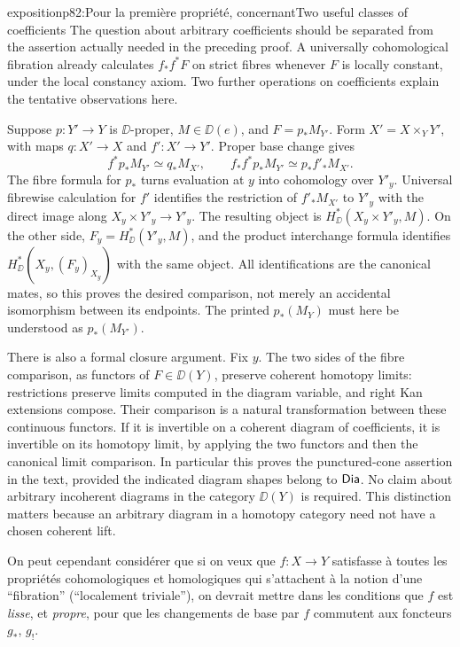 \begin{dcomment}{exposition}{p82:Pour la première propriété, concernant}{Two useful classes of coefficients}
The question about arbitrary coefficients should be separated from the assertion actually needed in the preceding proof. A universally cohomological fibration already calculates $f_*f^*F$ on strict fibres whenever $F$ is locally constant, under the local constancy axiom. Two further operations on coefficients explain the tentative observations here.

Suppose $p:Y'\to Y$ is $\DD$-proper, $M\in\DD(e)$, and $F=p_*M_{Y'}$. Form $X'=X\times_Y Y'$, with maps $q:X'\to X$ and $f':X'\to Y'$. Proper base change gives
\[
 f^*p_*M_{Y'}\simeq q_*M_{X'},\qquad
 f_*f^*p_*M_{Y'}\simeq p_*f'_*M_{X'}.
\]
The fibre formula for $p_*$ turns evaluation at $y$ into cohomology over $Y'_y$. Universal fibrewise calculation for $f'$ identifies the restriction of $f'_*M_{X'}$ to $Y'_y$ with the direct image along
$X_y\times Y'_y\to Y'_y$. The resulting object is
$H^*_{\DD}(X_y\times Y'_y,M)$.
On the other side, $F_y=H^*_{\DD}(Y'_y,M)$, and the product interchange formula identifies
$H^*_{\DD}(X_y,(F_y)_{X_y})$ with the same object. All identifications are the canonical mates, so this proves the desired comparison, not merely an accidental isomorphism between its endpoints. The printed $p_*(M_Y)$ must here be understood as $p_*(M_{Y'})$.

There is also a formal closure argument. Fix $y$. The two sides of the fibre comparison, as functors of $F\in\DD(Y)$, preserve coherent homotopy limits: restrictions preserve limits computed in the diagram variable, and right Kan extensions compose. Their comparison is a natural transformation between these continuous functors. If it is invertible on a coherent diagram of coefficients, it is invertible on its homotopy limit, by applying the two functors and then the canonical limit comparison. In particular this proves the punctured-cone assertion in the text, provided the indicated diagram shapes belong to $\mathsf{Dia}$. No claim about arbitrary incoherent diagrams in the category $\DD(Y)$ is required. This distinction matters because an arbitrary diagram in a homotopy category need not have a chosen coherent lift.
\end{dcomment}


\indent On peut cependant considérer que si on veux que $f : X \to Y$ satisfasse à toutes les propriétés cohomologiques et homologiques qui s'attachent à la notion d'une “fibration” (“localement triviale”), on devrait mettre dans les conditions que $f$ est \textit{lisse}, et \textit{propre}, pour que les changements de base par $f$ commutent aux foncteurs $g_*$, $g_!$. %


